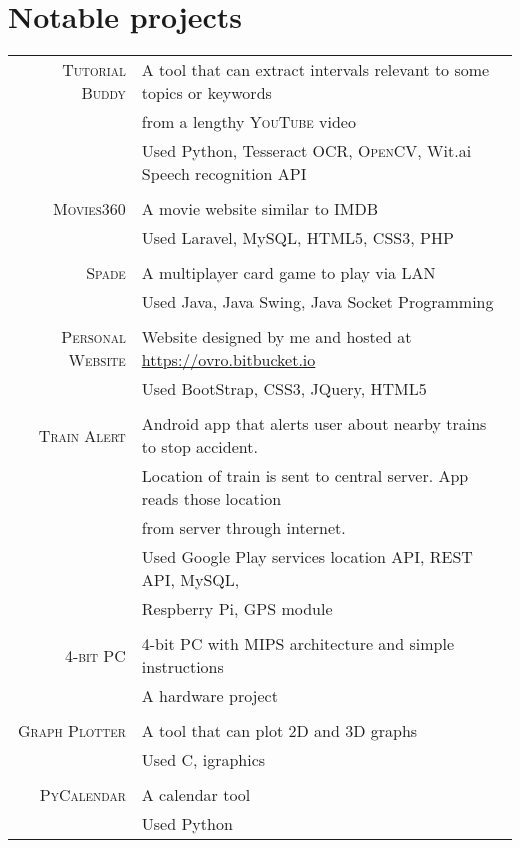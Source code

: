 \documentclass[a4paper,10pt]{article}
\begin{document}
\section{Notable projects}
\begin{longtable}{rl}

  \textsc{Tutorial Buddy} & A tool that can extract intervals relevant to some topics or keywords \\
  & from a lengthy \textsc{YouTube} video \\
  & Used Python, Tesseract \textsc{OCR}, \textsc{OpenCV}, Wit.ai Speech recognition API \\
  
  & \\
  
  \textsc{Movies360} & A movie website similar to \textsc{IMDB} \\
  & Used Laravel, My\textsc{SQL}, \textsc{HTML5}, \textsc{CSS3}, \textsc{PHP} \\

  & \\

  \textsc{Spade} & A multiplayer card game to play via \textsc{LAN} \\
  & Used Java, Java Swing, Java Socket Programming\\


  & \\

  \textsc{Personal Website} & Website designed by me and hosted at \href{https://ovro.bitbucket.io/}{https://ovro.bitbucket.io} \\
  & Used BootStrap, CSS3, JQuery, HTML5 \\

  & \\

  \textsc{Train Alert} & Android app that alerts user about nearby trains to stop accident. \\
  & Location of train is sent to central server. App reads those location \\
  & from server through internet. \\
  & Used Google Play services location API, \textsc{REST} API, My\textsc{SQL}, \\
  & Respberry Pi, GPS module \\
  
  & \\
  
  \textsc{4-bit PC} & 4-bit PC with MIPS architecture and simple instructions \\
  & A hardware project \\
  
  & \\

  \textsc{Graph Plotter} & A tool that can plot \textsc{2D} and \textsc{3D} graphs \\
  & Used C, igraphics \\

  & \\

  \textsc{PyCalendar} & A calendar tool \\
  & Used Python

\end{longtable}
\end{document}
